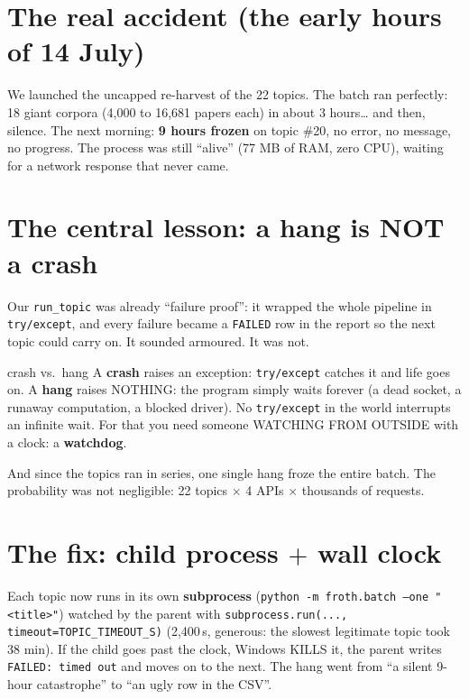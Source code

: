 \documentclass[11pt,a4paper]{article}
\begin{document}

\section{The real accident (the early hours of 14 July)}

We launched the uncapped re-harvest of the 22 topics. The batch ran perfectly: 18 giant corpora
(4,000 to 16,681 papers each) in about 3 hours\ldots{} and then, silence. The next morning:
\textbf{9 hours frozen} on topic \#20, no error, no message, no progress. The process was still
``alive'' (77 MB of RAM, zero CPU), waiting for a network response that never came.

\section{The central lesson: a hang is NOT a crash}

Our \texttt{run\_topic} was already ``failure proof'': it wrapped the whole pipeline in
\texttt{try/except}, and every failure became a \texttt{FAILED} row in the report so the next
topic could carry on. It sounded armoured. It was not.

\begin{concepto}{crash vs.\ hang}
A \textbf{crash} raises an exception: \texttt{try/except} catches it and life goes on.
A \textbf{hang} raises NOTHING: the program simply waits forever (a dead socket, a runaway
computation, a blocked driver). No \texttt{try/except} in the world interrupts an infinite
wait. For that you need someone WATCHING FROM OUTSIDE with a clock: a \textbf{watchdog}.
\end{concepto}

And since the topics ran in series, one single hang froze the entire batch. The probability was
not negligible: 22 topics $\times$ 4 APIs $\times$ thousands of requests.

\section{The fix: child process $+$ wall clock}

Each topic now runs in its own \textbf{subprocess}
(\texttt{python -m froth.batch --one "<title>"}) watched by the parent with
\texttt{subprocess.run(..., timeout=TOPIC\_TIMEOUT\_S)} (2,400\,s, generous: the slowest
legitimate topic took 38 min). If the child goes past the clock, Windows KILLS it, the parent
writes \texttt{FAILED: timed out} and moves on to the next. The hang went from ``a silent
9-hour catastrophe'' to ``an ugly row in the CSV''.
\end{document}
